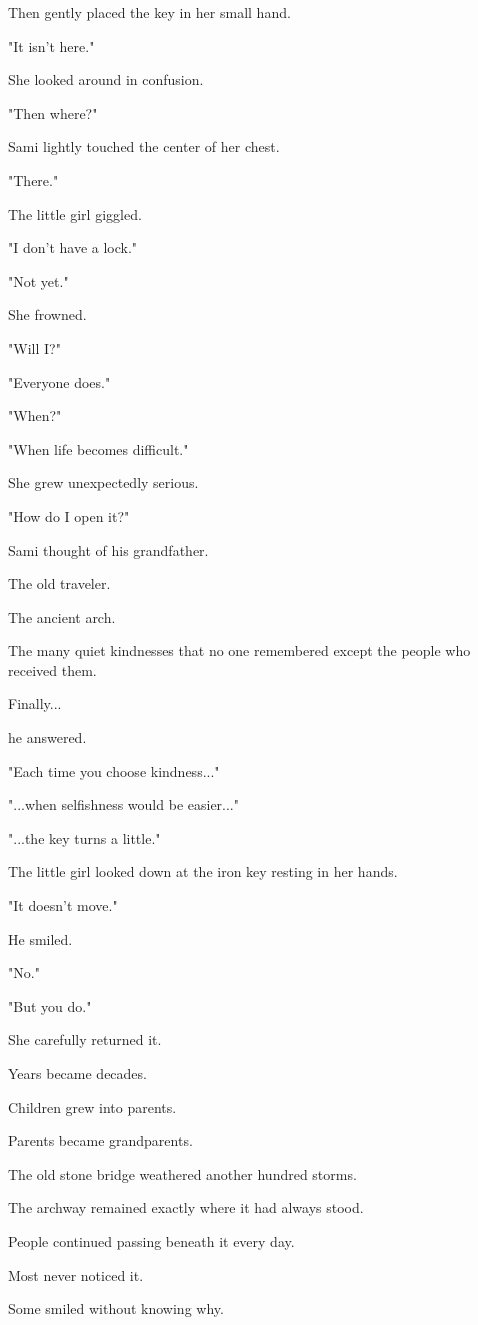 \documentclass[12pt,openany]{book}
\begin{document}
Then gently placed the key in her small hand.

"It isn't here."

She looked around in confusion.

"Then where?"

Sami lightly touched the center of her chest.

"There."

The little girl giggled.

"I don't have a lock."

"Not yet."

She frowned.

"Will I?"

"Everyone does."

"When?"

"When life becomes difficult."

She grew unexpectedly serious.

"How do I open it?"

Sami thought of his grandfather.

The old traveler.

The ancient arch.

The many quiet kindnesses that no one remembered except the people who received them.

Finally...

he answered.

"Each time you choose kindness..."

"...when selfishness would be easier..."

"...the key turns a little."

The little girl looked down at the iron key resting in her hands.

"It doesn't move."

He smiled.

"No."

"But you do."

She carefully returned it.

Years became decades.

Children grew into parents.

Parents became grandparents.

The old stone bridge weathered another hundred storms.

The archway remained exactly where it had always stood.

People continued passing beneath it every day.

Most never noticed it.

Some smiled without knowing why.
\end{document}
